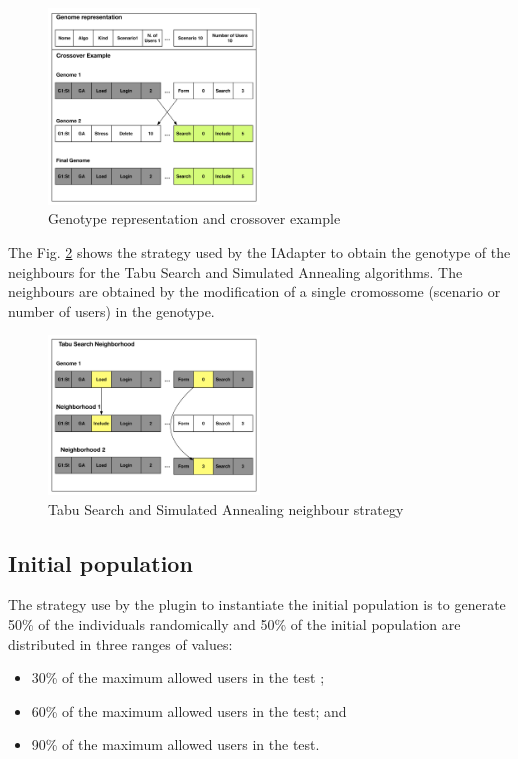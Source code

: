 \begin{figure}[h]
\includegraphics[width=0.5\textwidth]{./images/genomerepresentation.png}
\caption{Genotype representation and crossover example}
\label{fig:genomarepresentation}
\end{figure}

The Fig. \ref{fig:neighbourtaby} shows the strategy used by the IAdapter to obtain the genotype of the neighbours for the Tabu Search and Simulated Annealing algorithms.  The neighbours are obtained by the modification of a single cromossome (scenario or  number of users) in the genotype.

\begin{figure}[h]
\includegraphics[width=0.5\textwidth]{./images/TabuNE.png}
\caption{Tabu Search and Simulated Annealing neighbour strategy}
\label{fig:neighbourtaby}
\end{figure}


\subsection{Initial population}

The strategy use by the plugin to instantiate the initial population is to generate 50\% of the individuals randomically and 50\% of the initial population are distributed in three  ranges of values:

\begin{itemize}
\item 30\% of the maximum allowed users in the test ;
\item 60\% of the maximum allowed users in the test; and
\item 90\% of the maximum allowed users in the test.
\end{itemize}


